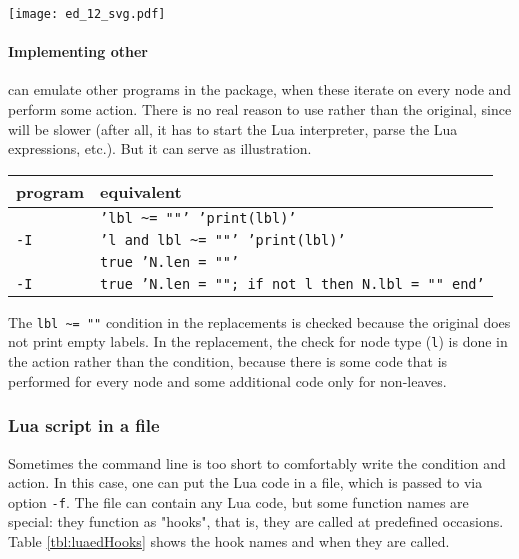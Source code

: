 
\begin{center}
\texttt{[image: ed\_12\_svg.pdf]}
\end{center}

\begin{samepage}
\paragraph{Implementing other \nutils}

\noindent{}\luaed{} can emulate other programs in the package, when these
iterate on every node and perform some action. There is no real reason to use
\luaed{} rather than the original, since \luaed{} will be slower (after all, it
has to start the Lua interpreter, parse the Lua expressions, etc.). But it
can serve as illustration.
\end{samepage}

\begin{center}
\begin{tabular}{ll}
program & \luaed{} equivalent \\
\hline
{}{} 						& {\tt 'lbl \~{}= ""' 'print(lbl)'}  \\
{} {\tt -I} 		& {\tt 'l and lbl \~{}= ""' 'print(lbl)'} \\
\topology{}						& {\tt true 'N.len = ""'} \\
\topology{} {\tt -I} 	& {\tt true 'N.len = ""; if not l then N.lbl = "" end'}
\end{tabular}
\end{center}

The {\tt lbl \~{}= ""} condition in the  replacements is checked
because the original  does not print empty labels. In the \topology{}
replacement, the check for node type (\texttt{l}) is done in the action rather
than the condition, because there is some code that is performed for every node
and some additional code only for non-leaves. 

\subsubsection{Lua script in a file}
\label{sct:lua_file_input}

Sometimes the command line is too short to comfortably write the condition and
action. In this case, one can put the Lua code in a file, which is passed to
\luaed{} via option \texttt{-f}. The file can contain any Lua code, but some
function names are special: they function as "hooks", that is, they are called
at predefined occasions. Table \ref{tbl:luaedHooks} shows the hook names and
when they are called.

